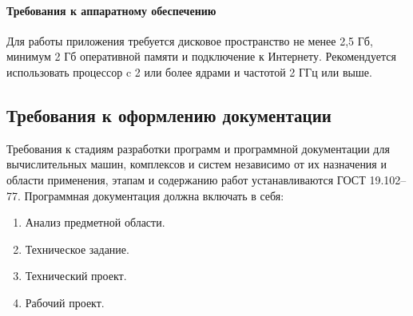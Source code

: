 \paragraph{Требования к аппаратному обеспечению}
Для работы приложения требуется дисковое пространство не менее 2,5 Гб, минимум 2 Гб оперативной памяти и подключение к Интернету. Рекомендуется использовать процессор c 2 или более ядрами и частотой 2 ГГц или выше.

\subsection{Требования к оформлению документации}
Требования к стадиям разработки программ и программной документации для вычислительных машин, комплексов и систем независимо от их назначения и области применения, этапам и содержанию работ устанавливаются ГОСТ 19.102–77. 
Программная документация должна включать в себя: 
\begin{enumerate}
	\item Анализ предметной области.
	\item Техническое задание.
	\item Технический проект.
	\item Рабочий проект.
\end{enumerate}
